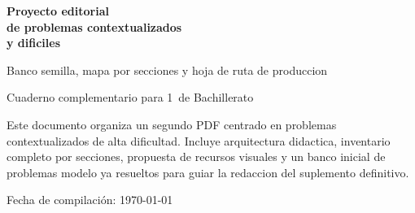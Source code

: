 \begin{titlepage}
\thispagestyle{fancy}
\centering
\vspace*{2.5cm}

{\Huge\bfseries Proyecto editorial\\[0.4em] de problemas contextualizados\\[0.4em] y dificiles\par}
\vspace{1.2cm}

{\Large Banco semilla, mapa por secciones y hoja de ruta de produccion\par}
\vspace{1.6cm}

{\Large Cuaderno complementario para 1\textordmasculine\ de Bachillerato\par}
\vspace{1.3cm}

\begin{tcolorbox}[basebox,width=0.86\textwidth]
Este documento organiza un segundo PDF centrado en problemas contextualizados de alta
dificultad. Incluye arquitectura didactica, inventario completo por secciones, propuesta de
recursos visuales y un banco inicial de problemas modelo ya resueltos para guiar la redaccion
del suplemento definitivo.
\end{tcolorbox}

\vfill
{\large Fecha de compilaci\'on: \today\par}
\end{titlepage}
